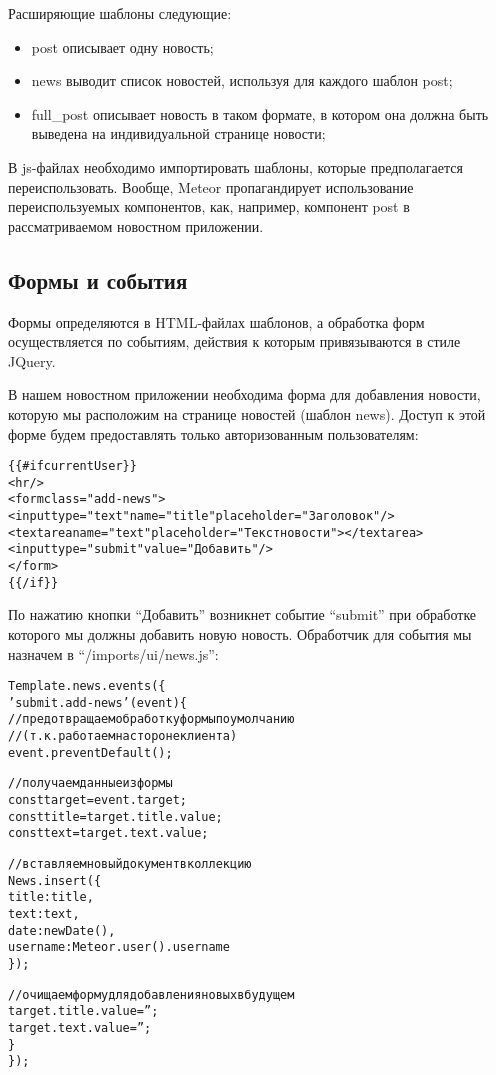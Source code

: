 \documentclass[a4paper,12pt]{article}
\begin{document}
Расширяющие шаблоны следующие: 
\begin{itemize}
	\item post описывает одну новость;
	\item news выводит список новостей, используя для каждого шаблон post;
	\item full\_post описывает новость в таком формате, в котором она должна быть
	выведена на индивидуальной странице новости;
\end{itemize}

В js-файлах необходимо импортировать шаблоны, которые предполагается переиспользовать.
Вообще, Meteor пропагандирует использование переиспользуемых компонентов, как, например,
компонент post в рассматриваемом новостном приложении.

\subsection{Формы и события}
Формы определяются в HTML-файлах шаблонов, а обработка форм
осуществляется по событиям, действия к которым привязываются
в стиле JQuery.

В нашем новостном приложении необходима форма для добавления новости,
которую мы расположим на странице новостей (шаблон news). Доступ
к этой форме будем предоставлять только авторизованным пользователям: 

\begin{alltt}
\{\{#if currentUser\}\}
  <hr/>
  <form class="add-news">
    <input type="text" name="title" placeholder="Заголовок"/>
    <textarea name="text" placeholder="Текст новости" ></textarea>
    <input type="submit" value="Добавить"/>
  </form>
\{\{/if\}\}
\end{alltt}

По нажатию кнопки ``Добавить'' возникнет событие ``submit''
при обработке которого мы должны добавить новую новость.
Обработчик для события мы назначем в ``/imports/ui/news.js'':

\begin{alltt}
Template.news.events(\{
    'submit .add-news'(event) \{
        // предотвращаем обработку формы по умолчанию 
        // (т.к. работаем на стороне клиента)
        event.preventDefault();
		
        // получаем данные из формы
        const target = event.target;
        const title = target.title.value;
        const text = target.text.value;
		
        // вставляем новый документ в коллекцию
        News.insert(\{
            title: title,
            text: text,
            date: new Date(), 
            username: Meteor.user().username
        \}); 
		
        // очищаем форму для добавления новых в будущем
        target.title.value = '';
        target.text.value = '';
    \}
\});
\end{alltt}
\end{document}
